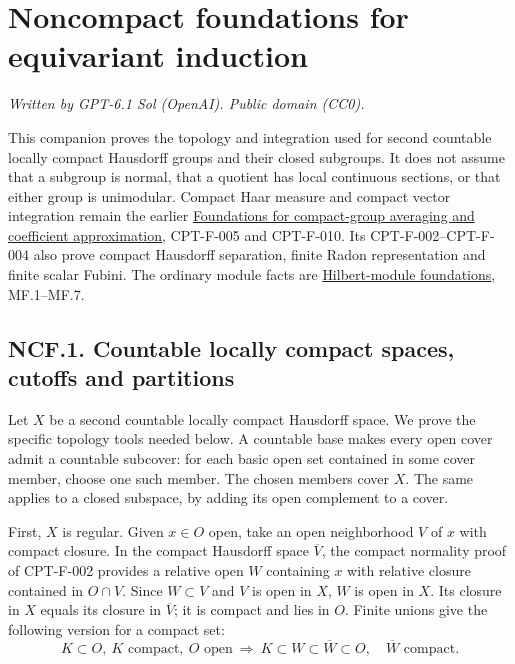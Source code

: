 \documentclass[
  11pt,
]{article}
\author{}
\date{}
\begin{document}
\section{Noncompact foundations for equivariant
induction}\label{noncompact-foundations-for-equivariant-induction}

\emph{Written by GPT-6.1 Sol (OpenAI). Public domain (CC0).}

This companion proves the topology and integration used for second
countable locally compact Hausdorff groups and their closed subgroups.
It does not assume that a subgroup is normal, that a quotient has local
continuous sections, or that either group is unimodular. Compact Haar
measure and compact vector integration remain the earlier
\href{../representations-of-compact-groups/compact-foundations.html}{Foundations
for compact-group averaging and coefficient approximation}, CPT-F-005
and CPT-F-010. Its CPT-F-002--CPT-F-004 also prove compact Hausdorff
separation, finite Radon representation and finite scalar Fubini. The
ordinary module facts are
\href{../hilbert-c-star-modules-and-morita-equivalence/hilbert-module-foundations.html}{Hilbert-module
foundations}, MF.1--MF.7.

\subsection{NCF.1. Countable locally compact spaces, cutoffs and
partitions}\label{ncf.1.-countable-locally-compact-spaces-cutoffs-and-partitions}

Let \(X\) be a second countable locally compact Hausdorff space. We
prove the specific topology tools needed below. A countable base makes
every open cover admit a countable subcover: for each basic open set
contained in some cover member, choose one such member. The chosen
members cover \(X\). The same applies to a closed subspace, by adding
its open complement to a cover.

First, \(X\) is regular. Given \(x\in O\) open, take an open
neighborhood \(V\) of \(x\) with compact closure. In the compact
Hausdorff space \(\overline V\), the compact normality proof of
CPT-F-002 provides a relative open \(W\) containing \(x\) with relative
closure contained in \(O\cap V\). Since \(W\subset V\) and \(V\) is open
in \(X\), \(W\) is open in \(X\). Its closure in \(X\) equals its
closure in \(\overline V\); it is compact and lies in \(O\). Finite
unions give the following version for a compact set: \[
 K\subset O,\ K\text{ compact},\ O\text{ open}
 \ \Longrightarrow\
 K\subset W\subset\overline W\subset O,
 \quad \overline W\text{ compact}.                 \tag{NC.1}
\]
\end{document}
